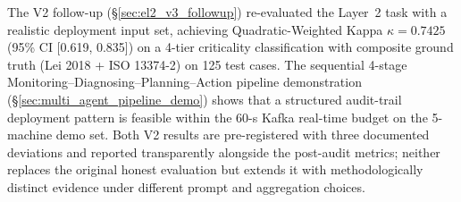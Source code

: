The V2 follow-up (§\ref{sec:el2_v3_followup}) re-evaluated the Layer~2 task with a realistic deployment input set, achieving Quadratic-Weighted Kappa $\kappa = 0.7425$ (95\% CI [0.619, 0.835]) on a 4-tier criticality classification with composite ground truth (Lei 2018 + ISO 13374-2) on 125 test cases. The sequential 4-stage Monitoring--Diagnosing--Planning--Action pipeline demonstration (§\ref{sec:multi_agent_pipeline_demo}) shows that a structured audit-trail deployment pattern is feasible within the 60-s Kafka real-time budget on the 5-machine demo set. Both V2 results are pre-registered with three documented deviations and reported transparently alongside the post-audit metrics; neither replaces the original honest evaluation but extends it with methodologically distinct evidence under different prompt and aggregation choices.
